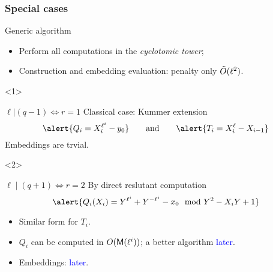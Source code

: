 \documentclass[12pt]{beamer}
\begin{document}

\begin{frame}
  \frametitle{Special cases}

  \begin{exampleblock}{Generic algorithm}
    \begin{itemize}
    \item Perform all computations in the \emph{cyclotomic tower};
    \item Construction and embedding evaluation: penalty only \alert{$\tilde{O}(\ell^2)$}.
    \end{itemize}
  \end{exampleblock}

  \begin{overlayarea}{\textwidth}{5cm}
    \begin{onlyenv}<1>
      \begin{exampleblock}{$\ell | (q-1) \Leftrightarrow r=1$}
        Classical case: Kummer extension
        \[\alert{Q_i=X_i^{\ell^i}-y_0} \qquad\text{and}\qquad \alert{T_i=X_{i}^\ell-X_{i-1}}\]
        Embeddings are trvial.
      \end{exampleblock}
    \end{onlyenv}	

    \begin{onlyenv}<2>
      \begin{exampleblock}{$\ell \mid (q + 1) \Leftrightarrow r = 2$}
        By direct reslutant computation
        \[\alert{Q_i(X_i) = Y^{\ell^i} + Y^{-\ell^i} - x_0 \mod Y^2-X_iY+1}\]

        \vspace*{-3mm}
        \begin{itemize}
        \item Similar form for $T_i$.
        \item $Q_i$ can be computed in $O(\mathsf{M}(\ell^i))$; a better algorithm \textcolor{blue}{later}.
        \item Embeddings: \textcolor{blue}{later}.
        \end{itemize}
      \end{exampleblock}
    \end{onlyenv}	
  \end{overlayarea}
\end{frame}


\end{document}
